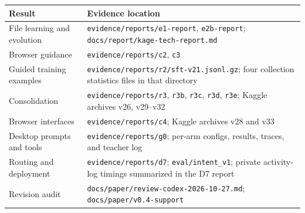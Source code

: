 \documentclass[
  10pt,
]{article}
\newcounter{none} %
\begin{document}
{\def\LTcaptype{none} %
\begin{longtable}[]{@{}
  >{\raggedright\arraybackslash}p{}
  >{\raggedright\arraybackslash}p{}@{}}
\toprule\noalign{}
\begin{minipage}[b]{\linewidth}\raggedright
Result
\end{minipage} & \begin{minipage}[b]{\linewidth}\raggedright
Evidence location
\end{minipage} \\
\midrule\noalign{}
\endhead
\bottomrule\noalign{}
\endlastfoot
File learning and evolution & \texttt{evidence/reports/e1-report},
\texttt{e2b-report}; \texttt{docs/report/kage-tech-report.md} \\
Browser guidance & \texttt{evidence/reports/c2}, \texttt{c3} \\
Guided training examples &
\texttt{evidence/reports/r2/sft-v21.jsonl.gz}; four collection
statistics files in that directory \\
Consolidation & \texttt{evidence/reports/r3}, \texttt{r3b},
\texttt{r3c}, \texttt{r3d}, \texttt{r3e}; Kaggle archives v26,
v29--v32 \\
Browser interfaces & \texttt{evidence/reports/c4}; Kaggle archives v28
and v33 \\
Desktop prompts and tools & \texttt{evidence/reports/g0}; per-arm
configs, results, traces, and teacher log \\
Routing and deployment & \texttt{evidence/reports/d7};
\texttt{eval/intent\_v1}; private activity-log timings summarized in the
D7 report \\
Revision audit & \texttt{docs/paper/review-codex-2026-10-27.md};
\texttt{docs/paper/v0.4-support} \\
\end{longtable}
}
\end{document}
